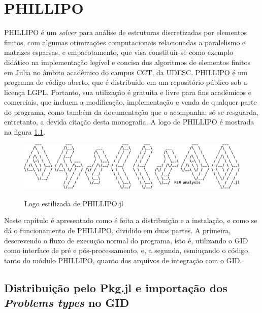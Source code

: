 

\chapter{PHILLIPO}

PHILLIPO é um \emph{solver} para análise de estruturas discretizadas por elementos finitos, com algumas otimizações computacionais relacionadas a paralelismo e matrizes esparsas, e empacotamento, que visa constituir-se como exemplo didático na implementação legível e concisa dos algoritmos de elementos finitos em Julia no âmbito acadêmico do campus CCT, da UDESC. PHILLIPO é um programa de código aberto, que é distribuído em um repositório público\footnotemark[1]{} sob a licença LGPL\footnotemark[2]{}. Portanto, sua utilização é gratuita e livre para fins acadêmicos e comerciais, que incluem a modificação, implementação e venda de qualquer parte do programa, como também da documentação que o acompanha; só se resguarda, entretanto, a devida citação desta monografia. A logo de PHILLIPO é mostrada na figura \ref{fig:log_phillipo}.

\begin{figure}[hbtp]
    \centering
    \caption{Logo estilizada de PHILLIPO.jl}
    \includegraphics[width = \textwidth]{Figuras/logo_phillipo.pdf}
    \label{fig:log_phillipo}
\end{figure}

Neste capítulo é apresentado como é feita a distribuição e a instalação, e como se dá o funcionamento de PHILLIPO, dividido em duas partes. A primeira, descrevendo o fluxo de execução normal do programa, isto é, utilizando o GID como interface de pré e pós-processamento, e, a segunda, esmiuçando o código, tanto do módulo PHILLIPO, quanto dos arquivos de integração com o GID.

\section{Distribuição pelo Pkg.jl e importação dos \emph{Problems types} no GID}

